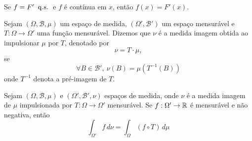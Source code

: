 \begin{thm:tfc qs}
\label{thm:tfc qs}
Se $f = F' \;\;\mathrm{q.s.}\;$ e $f$ é contínua em $x$, então $f(x) = F'(x)$.
\end{thm:tfc qs}

\begin{def:medida imagem}
\label{def:medida imagem}
Sejam $(\Omega, \mathcal{B}, \mu)$ um espaço de medida, $(\Omega', \mathcal{B}')$ um espaço
mensurável e $T: \Omega \to \Omega'$ uma função mensurável.
Dizemos que $\nu$ é a medida imagem obtida ao impulsionar $\mu$ por $T$, denotado por
\[
	\nu = T \cdot \mu,
\]
se
\[
	\forall B \in \mathcal{B}',\ \nu(B) = \mu(T^{-1}(B))
\]
onde $T^{-1}$ denota a pré-imagem de $T$.
\end{def:medida imagem}

\begin{thm:mudanca de variavel}
\label{thm:mudanca de variavel}
Sejam $(\Omega, \mathcal{B}, \mu)$ e $(\Omega', \mathcal{B}', \nu)$ espaços de medida,
onde $\nu$ é a medida imagem de $\mu$ impulsionada por $T: \Omega \to \Omega'$ mensurável.
Se $f: \Omega' \to \mathbb{R}$ é mensurável e não negativa, então
\[
	\int_{\Omega'} f\, d\nu = \int_\Omega (f \circ T)\, d\mu
\]
\end{thm:mudanca de variavel}
